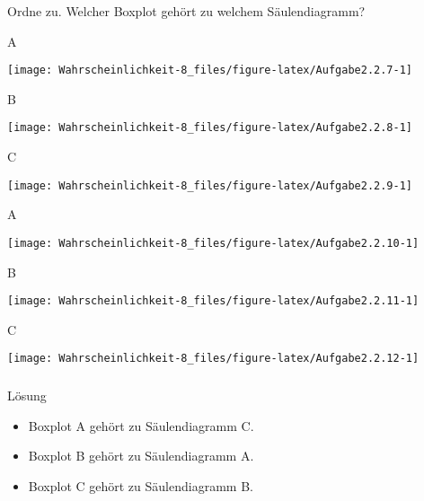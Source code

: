\documentclass[
  ngerman,
]{book}
\begin{document}
Ordne zu. Welcher Boxplot gehört zu welchem Säulendiagramm?

A

\begin{center}\texttt{[image: Wahrscheinlichkeit-8\_files/figure-latex/Aufgabe2.2.7-1]} \end{center}

B

\begin{center}\texttt{[image: Wahrscheinlichkeit-8\_files/figure-latex/Aufgabe2.2.8-1]} \end{center}

C

\begin{center}\texttt{[image: Wahrscheinlichkeit-8\_files/figure-latex/Aufgabe2.2.9-1]} \end{center}

A

\begin{center}\texttt{[image: Wahrscheinlichkeit-8\_files/figure-latex/Aufgabe2.2.10-1]} \end{center}

B

\begin{center}\texttt{[image: Wahrscheinlichkeit-8\_files/figure-latex/Aufgabe2.2.11-1]} \end{center}

C

\begin{center}\texttt{[image: Wahrscheinlichkeit-8\_files/figure-latex/Aufgabe2.2.12-1]} \end{center}

\hypertarget{section-37}{%
\subsubsection*{}\label{section-37}}

Lösung

\begin{itemize}
\item
  Boxplot A gehört zu Säulendiagramm C.
\item
  Boxplot B gehört zu Säulendiagramm A.
\item
  Boxplot C gehört zu Säulendiagramm B.
\end{itemize}

\hypertarget{section-38}{%
\subsubsection*{}\label{section-38}}
\end{document}
